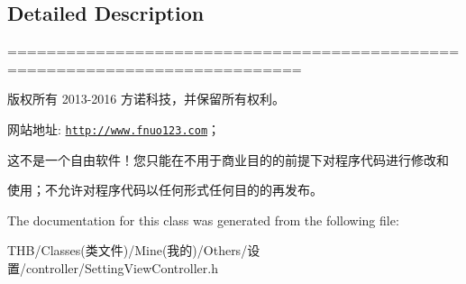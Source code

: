 \subsection{Detailed Description}
============================================================================

版权所有 2013-\/2016 方诺科技，并保留所有权利。

网站地址\+: \href{http://www.fnuo123.com}{\tt http\+://www.\+fnuo123.\+com}； 



这不是一个自由软件！您只能在不用于商业目的的前提下对程序代码进行修改和

使用；不允许对程序代码以任何形式任何目的的再发布。 

 

The documentation for this class was generated from the following file\+:\begin{DoxyCompactItemize}
\item 
T\+H\+B/\+Classes(类文件)/\+Mine(我的)/\+Others/设置/controller/Setting\+View\+Controller.\+h\end{DoxyCompactItemize}
